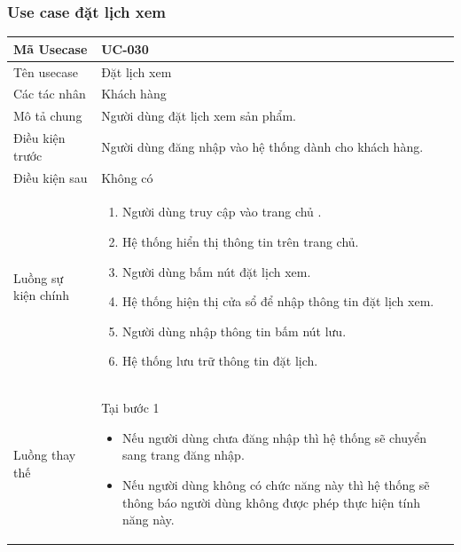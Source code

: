 \documentclass[12pt,a4paper]{article}
\begin{document}

    \subsubsection*{Use case đặt lịch xem}
    \begin{table}[H]
        \centering
        \begin{tabular}{|p{3.5cm}|p{11.5cm}|c|}
            \hline
            Mã Usecase      & UC-030                                                 \\
            \hline
            Tên usecase     & Đặt lịch xem                                           \\
            \hline
            Các tác nhân    & Khách hàng                                             \\
            \hline
            Mô tả chung     & Người dùng đặt lịch xem sản phẩm.                      \\
            \hline

            Điều kiện trước & Người dùng đăng nhập vào hệ thống dành cho khách hàng. \\
            \hline

            Điều kiện sau   & Không có                                               \\
            \hline

            Luồng sự kiện chính & \vspace{-.8cm}\begin{enumerate}
                                                    \item Người dùng truy cập vào trang chủ .
                                                    \item Hệ thống hiển thị thông tin trên trang chủ.
                                                    \item Người dùng bấm nút đặt lịch xem.
                                                    \item Hệ thống hiện thị cửa sổ để nhập thông tin đặt lịch xem.
                                                    \item Người dùng nhập thông tin bấm nút lưu.
                                                    \item Hệ thống lưu trữ thông tin đặt lịch.
            \end{enumerate}
            \\
            \hline
            Luồng thay thế & Tại bước 1\newline
            \vspace{-.8cm}\begin{itemize}
                              \item Nếu người dùng chưa đăng nhập thì hệ thống sẽ chuyển sang trang đăng nhập.
                              \item Nếu người dùng không có chức năng này thì hệ thống sẽ thông báo người dùng không được phép thực hiện tính năng này.
            \end{itemize}


\end{tabular}
\end{table}
\end{document}
